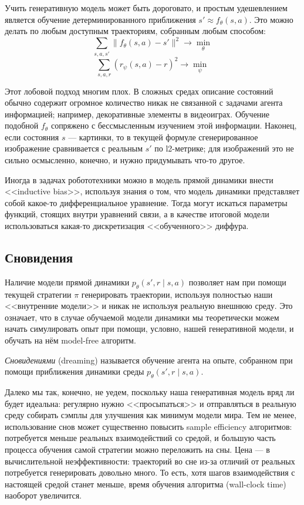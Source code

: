 Учить генеративную модель может быть дороговато, и простым удешевлением является обучение детерминированного приближения $s' \approx f_\theta(s, a)$. Это можно делать по любым доступным траекториям, собранным любым способом:
$$\sum_{s, a, s'} \|f_\theta(s, a) - s'\|^2 \to \min_\theta$$
$$\sum_{s, a, r} \left( r_\psi(s, a) - r \right)^2 \to \min_\psi$$

Этот лобовой подход многим плох. В сложных средах описание состояний обычно содержит огромное количество никак не связанной с задачами агента информацией; например, декоративные элементы в видеоиграх. Обучение подобной $f_\theta$ сопряжено с бессмысленным изучением этой информации. Наконец, если состояния $s$ --- картинки, то в текущей формуле сгенерированное изображение сравнивается с реальным $s'$ по l2-метрике; для изображений это не сильно осмысленно, конечно, и нужно придумывать что-то другое.


\begin{remark}
Иногда в задачах робототехники можно в модель прямой динамики внести <<inductive bias>>, используя знания о том, что модель динамики представляет собой какое-то дифференциальное уравнение. Тогда могут искаться параметры функций, стоящих внутри уравнений связи, а в качестве итоговой модели использоваться какая-то дискретизация <<обученного>> диффура.
\end{remark}

\subsection{Сновидения}

Наличие модели прямой динамики $p_\theta(s', r \mid s, a)$ позволяет нам при помощи текущей стратегии $\pi$ генерировать траектории, используя полностью наши <<внутренние модели>> и никак не используя реальную внешнюю среду. Это означает, что в случае обучаемой модели динамики мы теоретически можем начать симулировать опыт при помощи, условно, нашей генеративной модели, и обучать на нём model-free алгоритм.

\begin{definition}
\emph{Сновидениями} (dreaming) называется обучение агента на опыте, собранном при помощи приближения динамики среды $p_\theta(s', r \mid s, a)$.
\end{definition}

Далеко мы так, конечно, не уедем, поскольку наша генеративная модель вряд ли будет идеальна: регулярно нужно <<просыпаться>> и отправляться в реальную среду собирать сэмплы для улучшения как минимум модели мира. Тем не менее, использование снов может существенно повысить sample efficiency алгоритмов: потребуется меньше реальных взаимодействий со средой, и большую часть процесса обучения самой стратегии можно переложить на сны. Цена --- в вычислительной неэффективности: траекторий во сне из-за отличий от реальных потребуется генерировать довольно много. То есть, хотя шагов взаимодействия с настоящей средой станет меньше, время обучения алгоритма (wall-clock time) наоборот увеличится. 

